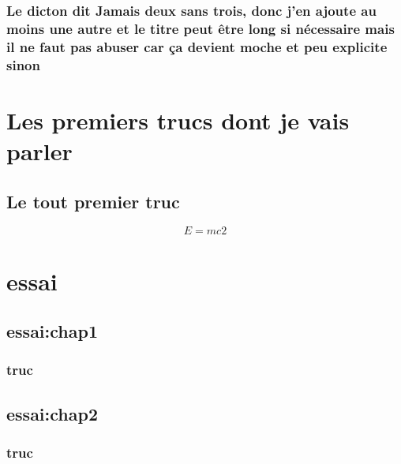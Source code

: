 \documentclass{polytech/polytech}
\begin{document}
                       
           
     
\section{Le dicton dit \og{}Jamais deux sans trois\fg{}, donc j'en ajoute au moins une autre et le titre peut être long si nécessaire mais il ne faut pas abuser car ça devient moche et peu explicite sinon}

\lipsum[1-3] 

\part{Les premiers trucs dont je vais parler}                
\label{part:premierstrucs}

\chapter{Le tout premier truc}   
\label{chap:toutpremier}

\begin{equation}
\label{eq:2} 
E=mc2
\end{equation}       
  
  

\lipsum[1]
           

\part{essai}
\label{part:essai}
 
\chapter{essai:chap1}
\label{essai:chap1}
      
\lipsum[1-4]
     
\section{truc}

\label{essai:chap1:sec}

\chapter*{essai:chap2}
\label{essai:chap2}
     
\lipsum[1-4]

\section{truc}
\end{document}
